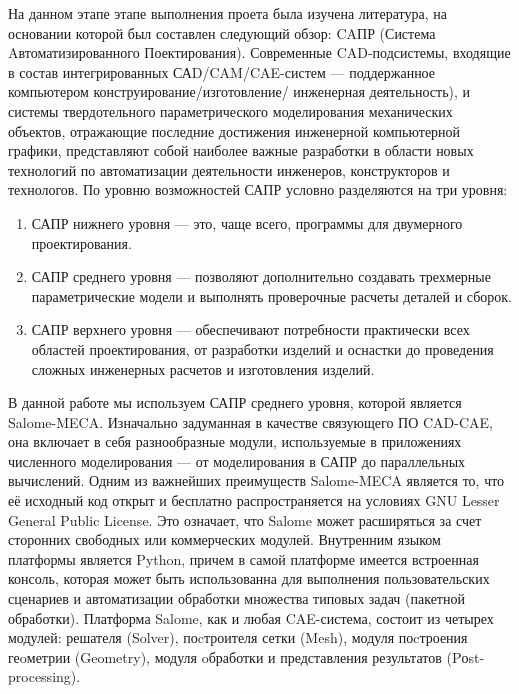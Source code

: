 \documentclass[a4paper,12pt]{article}
\theoremstyle{plain} %
\theoremstyle{definition} %
\theoremstyle{remark} %
\begin{document}
	На данном этапе этапе выполнения проета была изучена литература, на основании которой был составлен следующий обзор:
	CAПР (Система Aвтоматизированного Поектирования). Современные CAD-подсистемы, входящие в состав интегрированных САD/CAM/CAE-систем — поддержанное компьютером конструирование/изготовление/ инженерная деятельность), и системы твердотельного параметрического моделирования механических объектов, отражающие последние достижения инженерной компьютерной графики, представляют собой наиболее важные разработки в области новых технологий по автоматизации деятельности инженеров,	конструкторов и технологов. По уровню возможностей САПР условно разделяются на три уровня:
	\begin{enumerate}
		\item САПР нижнего уровня — это, чаще всего, программы для двумерного проектирования.
		\item САПР среднего уровня — позволяют дополнительно создавать трехмерные параметрические модели и выполнять проверочные расчеты деталей и сборок.
		\item САПР верхнего уровня — обеспечивают потребности практически всех областей проектирования, от разработки изделий и оснастки до проведения сложных инженерных расчетов и изготовления изделий\cite{bBolshakov}.
	\end{enumerate}
	В данной работе мы используем САПР среднего уровня, которой является Salome-MECA. Изначально задуманная в качестве связующего ПО CAD-CAE, она включает в себя разнообразные модули, используемые в приложениях численного моделирования — от моделирования в САПР до параллельных вычислений. Одним из важнейших преимуществ Salome-MECA является то, что её исходный код открыт и бесплатно распространяется на условиях GNU Lesser General Public License. Это означает, что Salome может расширяться за счет сторонних свободных или коммерческих модулей. Внутренним языком платформы является Python, причем в самой платформе имеется встроенная консоль, которая может быть использованна для выполнения пользовательских сценариев и автоматизации обработки множества типовых задач (пакетной обработки)\cite{wOfDoc}. Платформа Salome, как и любая CAE-система, состоит из четырех модулей: решателя (Solver), поcтроителя сетки (Mesh), модуля поcтроения геoметрии (Geometry), модуля oбработки и представления результатов (Pоst-processing).
			
\end{document}
